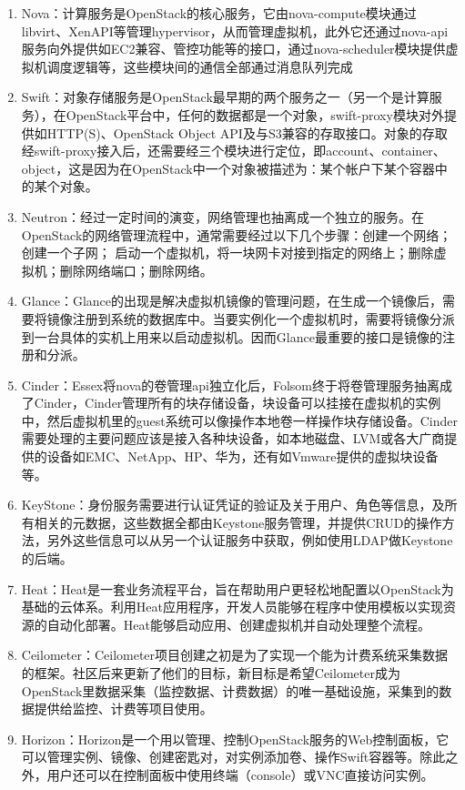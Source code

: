 \begin{enumerate}
\item Nova：计算服务是OpenStack的核心服务，它由nova-compute模块通过libvirt、XenAPI等管理hypervisor，从而管理虚拟机，此外它还通过nova-api服务向外提供如EC2兼容、管控功能等的接口，通过nova-scheduler模块提供虚拟机调度逻辑等，这些模块间的通信全部通过消息队列完成
\item Swift：对象存储服务是OpenStack最早期的两个服务之一（另一个是计算服务），在OpenStack平台中，任何的数据都是一个对象，swift-proxy模块对外提供如HTTP(S)、OpenStack Object API及与S3兼容的存取接口。对象的存取经swift-proxy接入后，还需要经三个模块进行定位，即account、container、object，这是因为在OpenStack中一个对象被描述为：某个帐户下某个容器中的某个对象。
\item Neutron：经过一定时间的演变，网络管理也抽离成一个独立的服务。在OpenStack的网络管理流程中，通常需要经过以下几个步骤：创建一个网络； 创建一个子网； 启动一个虚拟机，将一块网卡对接到指定的网络上；删除虚拟机；删除网络端口；删除网络。
\item Glance：Glance的出现是解决虚拟机镜像的管理问题，在生成一个镜像后，需要将镜像注册到系统的数据库中。当要实例化一个虚拟机时，需要将镜像分派到一台具体的实机上用来以启动虚拟机。因而Glance最重要的接口是镜像的注册和分派。
\item Cinder：Essex将nova的卷管理api独立化后，Folsom终于将卷管理服务抽离成了Cinder，Cinder管理所有的块存储设备，块设备可以挂接在虚拟机的实例中，然后虚拟机里的guest系统可以像操作本地卷一样操作块存储设备。Cinder需要处理的主要问题应该是接入各种块设备，如本地磁盘、LVM或各大广商提供的设备如EMC、NetApp、HP、华为，还有如Vmware提供的虚拟块设备等。
\item KeyStone：身份服务需要进行认证凭证的验证及关于用户、角色等信息，及所有相关的元数据，这些数据全都由Keystone服务管理，并提供CRUD的操作方法，另外这些信息可以从另一个认证服务中获取，例如使用LDAP做Keystone的后端。
\item Heat：Heat是一套业务流程平台，旨在帮助用户更轻松地配置以OpenStack为基础的云体系。利用Heat应用程序，开发人员能够在程序中使用模板以实现资源的自动化部署。Heat能够启动应用、创建虚拟机并自动处理整个流程。
\item Ceilometer：Ceilometer项目创建之初是为了实现一个能为计费系统采集数据的框架。社区后来更新了他们的目标，新目标是希望Ceilometer成为OpenStack里数据采集（监控数据、计费数据）的唯一基础设施，采集到的数据提供给监控、计费等项目使用。
\item Horizon：Horizon是一个用以管理、控制OpenStack服务的Web控制面板，它可以管理实例、镜像、创建密匙对，对实例添加卷、操作Swift容器等。除此之外，用户还可以在控制面板中使用终端（console）或VNC直接访问实例。
\end{enumerate}
